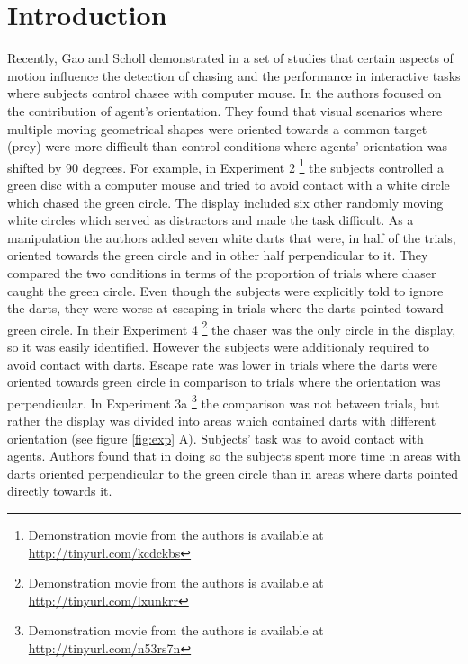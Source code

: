 \documentclass[10pt]{article}
\begin{document}
\section*{Introduction}
Recently, Gao and Scholl demonstrated in a set of studies \cite{gao09,gao10,gao11} that certain aspects of motion influence the detection of chasing and the performance in interactive tasks where subjects control chasee with computer mouse. 
In \cite{gao10} the authors focused on the contribution of agent's orientation. 
They found that visual scenarios where multiple moving geometrical shapes were oriented towards a common target (prey) were more difficult than control conditions where agents' orientation was shifted by 90 degrees. 
For example, in Experiment 2 \footnote{Demonstration movie from the authors is available at \url{http://tinyurl.com/kcdckbs}} the subjects controlled a green disc with a computer mouse and tried to avoid contact with a white circle which chased the green circle.
The display included six other randomly moving white circles which served as distractors and made the task difficult. 
As a manipulation the authors added seven white darts that were, in half of the trials, oriented towards the green circle and in other half perpendicular to it. 
They compared the two conditions in terms of the proportion of trials where chaser caught the green circle. 
Even though the subjects were explicitly told to ignore the darts, they were worse at escaping in trials where the darts pointed toward green circle. 
In their Experiment 4 \footnote{Demonstration movie from the authors is available at \url{http://tinyurl.com/lxunkrr}} the chaser was the only circle in the display, so it was easily identified. 
However the subjects were additionaly required to avoid contact with darts. 
Escape rate was lower in trials where the darts were oriented towards green circle in comparison to trials where the orientation was perpendicular. 
In Experiment 3a \footnote{Demonstration movie from the authors is available at \url{http://tinyurl.com/n53rs7n}} the comparison was not between trials, but rather the display was divided into areas which contained darts with different orientation (see figure \ref{fig:exp} A). 
Subjects' task was to avoid contact with agents. 
Authors found that in doing so the subjects spent more time in areas with darts oriented perpendicular to the green circle than in areas where darts pointed directly towards it.
\end{document}
